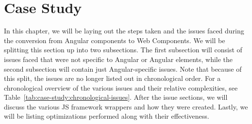 \chapter{Case Study}\label{chap:case-study}

In this chapter, we will be laying out the steps taken and the issues faced during the conversion from Angular components to Web Components. We will be splitting this section up into two subsections. The first subsection will consist of issues faced that were not specific to Angular or Angular elements, while the second subsection will contain just Angular-specific issues. Note that because of this split, the issues are no longer listed out in chronological order. For a chronological overview of the various issues and their relative complexities, see Table~\ref{tab:case-study:chronological-issues}. After the issue sections, we will discuss the various JS framework wrappers and how they were created. Lastly, we will be listing optimizations performed along with their effectiveness.

